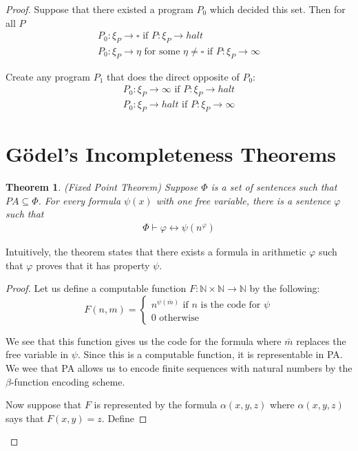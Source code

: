 \documentclass[a4paper,10pt]{article}
\newtheorem{theorem}{Theorem}[section]
\let\phi\varphi
\newcommand*\NN{\mathbb{N}}
\newcommand*\map{\rightarrow}
\newcommand*\n{\newline\par}
\begin{document}
\begin{proof}
 Suppose that there existed a program $P_0$ which decided this set.  Then for all $P$
 \begin{gather*}
  P_0: \xi_P \map\square \text{ if } P: \xi_P \map halt \\
  P_0: \xi_P  \map \eta \text{ for some $\eta \neq \square $ if } P: \xi_P \map \infty
 \end{gather*}

 Create any program $P_1$ that does the direct opposite of $P_0$:
 \begin{gather*}
  P_0: \xi_P \map\infty \text{ if } P: \xi_P \map halt \\
  P_0: \xi_P  \map halt \text{ if } P: \xi_P \map \infty
 \end{gather*}


 
\section{G{\"o}del's Incompleteness Theorems}

\begin{theorem}
(Fixed Point Theorem) Suppose $\Phi$ is a set of sentences such that $PA \subseteq \Phi$. For every formula $\psi(x)$ with one free variable, there is a sentence $\phi$ such that
\begin{align*}
  \Phi \vdash \phi \leftrightarrow \psi(n^{\phi})
\end{align*}

\end{theorem}

Intuitively, the theorem states that there exists a formula in arithmetic $\phi$ such that $\phi$ proves that it has property $\psi$.
\begin{proof}

 Let us define a computable function $F: \NN \times \NN \map \NN$ by the following:
 \begin{equation*}
    F(n,m) = 
    \begin{cases}
     n^{\psi(\bar{m})} \text{ if $n$ is the code for $\psi$} \\
     0 \text{ otherwise}
    \end{cases}  
 \end{equation*}

 We see that this function gives us the code for the formula where $\bar{m}$ replaces the free variable in $\psi$. Since this is a computable function, it is representable in PA. We wee that PA allows us to encode finite sequences with natural numbers by the $\beta$-function encoding scheme. \n
 Now suppose that $F$ is represented by the formula $\alpha(x,y,z)$ where $\alpha(x,y,z)$ says that $F(x,y) = z$. Define
 

\end{proof}
\end{proof}
\end{document}
